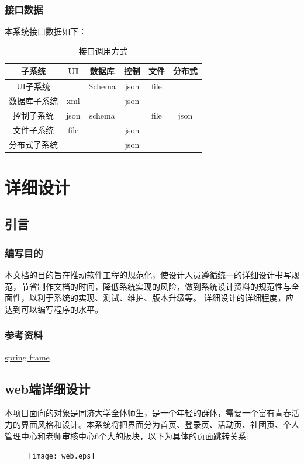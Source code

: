 \documentclass[UTF8]{ctexart}
\begin{document}
\subsubsection{接口数据}
本系统接口数据如下：\\
\begin{table}[H]
\centering
\caption{接口调用方式}
\begin{tabular}{|c|c|c|c|c|c|}
\hline
子系统&UI&数据库&控制&文件&分布式\\
\hline
UI子系统& &Schema&json&file& \\
\hline
数据库子系统&xml& &json& &  \\
\hline
控制子系统&json&schema& &file&json \\
\hline
文件子系统&file& &json& & \\
\hline
分布式子系统& & &json& & \\
\hline
\end{tabular}
\end{table}

\section{详细设计}
\subsection{引言}
\subsubsection{编写目的}
本文档的目的旨在推动软件工程的规范化，使设计人员遵循统一的详细设计书写规范，节省制作文档的时间，降低系统实现的风险，做到系统设计资料的规范性与全面性，以利于系统的实现、测试、维护、版本升级等。
详细设计的详细程度，应达到可以编写程序的水平。
\subsubsection{参考资料}
\href{http://docs.spring.io/spring/docs/5.0.0.M3/spring-framework-reference/htmlsingle/}{spring frame}
\subsection{web端详细设计}
本项目面向的对象是同济大学全体师生，是一个年轻的群体，需要一个富有青春活力的界面风格和设计。本系统将把界面分为首页、登录页、活动页、社团页、个人管理中心和老师审核中心6个大的版块，以下为具体的页面跳转关系:
\newline
\begin{figure}[H]
\centering
\texttt{[image: web.eps]}
\end{figure}
\end{document}
